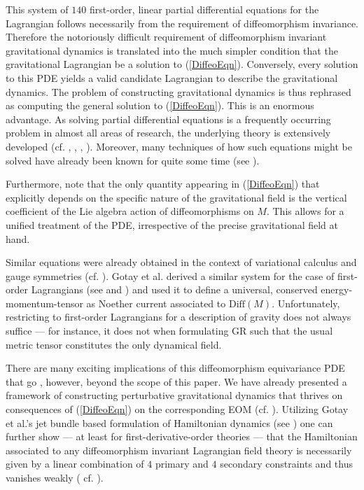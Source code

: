 \documentclass[%
 reprint,
nofootinbib,
 amsmath,amssymb,
 aps,
 prd,
floatfix,
]{revtex4-2}
\begin{document}
This system of $140$ first-order, linear partial differential equations for the Lagrangian follows necessarily from the requirement of diffeomorphism invariance. Therefore the notoriously difficult requirement of diffeomorphism invariant gravitational dynamics is translated into the much simpler condition that the gravitational Lagrangian be a solution to (\ref{DiffeoEqn}). Conversely, every solution to this PDE yields a valid candidate Lagrangian to describe the gravitational dynamics. 
The problem of constructing gravitational dynamics is thus rephrased as computing the general solution to (\ref{DiffeoEqn}). 
This is an enormous advantage. As solving partial differential equations is a frequently occurring problem in almost all areas of research, the underlying theory is extensively developed (cf. \cite{seiler2009involution}, \cite{hormander1994analysis}, \cite{hormander2009analysis}, \cite{hormander2015analysis}).
Moreover, many techniques of how such equations might be solved have already been known for quite some time (see \cite{Hilbert}).

Furthermore, note that the only quantity appearing in (\ref{DiffeoEqn}) that explicitly depends on the specific nature of the gravitational field is the vertical coefficient of the Lie algebra action of diffeomorphisms on $M$. This allows for a unified treatment of the PDE, irrespective of the precise gravitational field at hand. 

Similar equations were already obtained in the context of variational calculus and gauge symmetries (cf. \cite{article}). 
Gotay et al. derived a similar system for the case of first-order Lagrangians (see \cite{Gotay1992StressEnergyMomentumTA} and \cite{1998physics...1019G}) and used it to define a universal, conserved energy-momentum-tensor as Noether current associated to $\mathrm{Diff}(M)$. 
Unfortunately, restricting to first-order Lagrangians for a description of gravity does not always suffice --- for instance, it does not when formulating GR such that the usual metric tensor constitutes the only dynamical field.

There are many exciting implications of this diffeomorphism equivariance PDE that go , however, beyond the scope of this paper. We have already presented a framework of constructing perturbative gravitational dynamics that thrives on consequences of (\ref{DiffeoEqn}) on the corresponding EOM (cf. \cite{TobiR}).
Utilizing Gotay et al.'s jet bundle based formulation of Hamiltonian dynamics (see \cite{2004math.ph..11032G}) one can further show --- at least for first-derivative-order theories --- that the Hamiltonian associated to any diffeomorphism invariant Lagrangian field theory is necessarily given by a linear combination of $4$ primary and $4$ secondary constraints and thus vanishes weakly ( cf. \cite{TobiMaster}).
\end{document}
